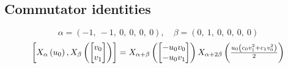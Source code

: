 \documentclass[11pt]{article}
\theoremstyle{definition}
\begin{document}
\def\arraystretch{1}

\subsection{Commutator identities}

\providecommand{\scaletoalign}[2]{%
  \sbox0{$#2$}%
  \ifdim\wd0>#1\relax 
    \resizebox{#1}{!}{\usebox0}%
  \else 
    \usebox0%
  \fi 
}
\[
\alpha = \left( -1, \  -1, \  0, \  0, \  0, \  0\right), \quad \beta = \left( 0, \  1, \  0, \  0, \  0, \  0\right)
\]
\[
\scaletoalign{\textwidth}{\left[ X_{\alpha}\left(u_{0}\right), X_{\beta}\left(\left[\begin{matrix}v_{0}\\v_{1}\end{matrix}\right]\right) \right] = X_{\alpha + \beta}\left(\left[\begin{matrix}- u_{0} v_{0}\\- u_{0} v_{1}\end{matrix}\right]\right) X_{\alpha + 2\beta}\left(\frac{u_{0} \left(c_{0} v_{1}^{2} + c_{1} v_{0}^{2}\right)}{2}\right)}
\]
\end{document}
